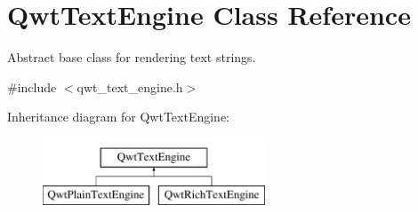 \hypertarget{class_qwt_text_engine}{\section{Qwt\-Text\-Engine Class Reference}
\label{class_qwt_text_engine}
}


Abstract base class for rendering text strings.  




{\ttfamily \#include $<$qwt\-\_\-text\-\_\-engine.\-h$>$}

Inheritance diagram for Qwt\-Text\-Engine\-:\begin{figure}[H]
\begin{center}
\leavevmode
\includegraphics[height=2.000000cm]{class_qwt_text_engine}
\end{center}
\end{figure}
